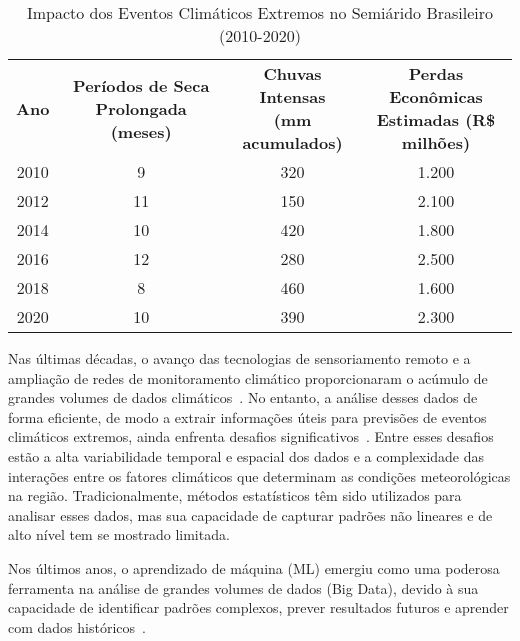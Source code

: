 \documentclass{projetodepesquisa} %
\begin{document}
	
	\begin{table}[ht]
		\centering
		\caption{Impacto dos Eventos Climáticos Extremos no Semiárido Brasileiro (2010-2020)}
		\label{tab:impacto_climatico_semiarido}
		\begin{tabular}{|c|c|c|c|}
			\hline
			\multirow{3}{*}{\textbf{Ano}} & \multirow{3}{*}{\parbox{3.5cm}{\centering\textbf{Períodos de Seca Prolongada}\\ \textbf{(meses)}}} & \multirow{3}{*}{\parbox{3.5cm}{\centering\textbf{Chuvas Intensas}\\ \textbf{(mm acumulados)}}} & \multirow{3}{*}{\parbox{4cm}{\centering\textbf{Perdas Econômicas}\\ \textbf{Estimadas (R\$ milhões)}}} \\
			& & & \\
			& & & \\
			\hline
			2010 & 9  & 320  & 1.200  \\
			\hline
			2012 & 11 & 150  & 2.100  \\
			\hline
			2014 & 10 & 420  & 1.800  \\
			\hline
			2016 & 12 & 280  & 2.500  \\
			\hline
			2018 & 8  & 460  & 1.600  \\
			\hline
			2020 & 10 & 390  & 2.300  \\
			\hline
		\end{tabular}
	\end{table}
	
	Nas últimas décadas, o avanço das tecnologias de sensoriamento remoto e a ampliação de redes de monitoramento climático proporcionaram o acúmulo de grandes volumes de dados climáticos~\cite{andrade2020}. No entanto, a análise desses dados de forma eficiente, de modo a extrair informações úteis para previsões de eventos climáticos extremos, ainda enfrenta desafios significativos~\cite{santos2018}. Entre esses desafios estão a alta variabilidade temporal e espacial dos dados e a complexidade das interações entre os fatores climáticos que determinam as condições meteorológicas na região. Tradicionalmente, métodos estatísticos têm sido utilizados para analisar esses dados, mas sua capacidade de capturar padrões não lineares e de alto nível tem se mostrado limitada.
	
	Nos últimos anos, o aprendizado de máquina (ML) emergiu como uma poderosa ferramenta na análise de grandes volumes de dados (Big Data), devido à sua capacidade de identificar padrões complexos, prever resultados futuros e aprender com dados históricos~\cite{almeida2021}. 
	
\end{document}
